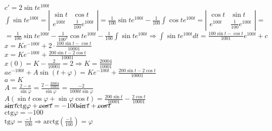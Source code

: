 $c'=2\sin t e^{100t}$\\
$\int \sin t e^{100t}=\left|\begin{array}{cc}\sin t & \cos t \\ e^{100t} & \frac{1}{100}e^{100t}\end{array}\right|=\frac{1}{100}\sin t e^{100t}-\frac{1}{100} \int \cos t e^{100t}=\left|\begin{array}{cc}\cos t & \sin t \\ e^{100t} & \frac{1}{100}e^{100t}\end{array}\right|=$\\
$=\frac{1}{100}\sin t e^{100t}-\frac{1}{100^2}\cos t e^{100t}-\frac{1}{100} \int \sin t e^{100t} \Rightarrow \int \sin t e^{100t} dt = \boxed{\frac{100\sin t - \cos t}{1001}e^{100t}+c}$\\
$\boxed{x=Ke^{-100t}+2\cdot\frac{100\sin t - \cos t}{10001}}$\\
$x=Ke^{-100t}+\frac{200\sin t -2\cos t}{10001}$\\
$x(0)=K-\frac{2}{10001}=2 \Rightarrow K=\frac{20004}{10001}$\\
$ae^{-100t}+A\sin(t+\varphi)=Ke^{-100t}+\frac{200\sin t - 2 \cos t}{10001}$\\
$a=K$\\
$A=\frac{2-a}{\sin \varphi}=\frac{2-\frac{20004}{10001}}{\sin \varphi}=\frac{-2}{1000t\sin\varphi}$\\
$A(\sin t \cos \varphi + \sin \varphi \cos t)=\frac{200\sin t}{10001}-\frac{2\cos t}{10001}$\\
$\cancel{\sin t}\text{ctg}\varphi+\cancel{\cos t}=-100\cancel{\sin t}+\cancel{\cos t}$\\
$\text{ctg}\varphi= -100$\\
$\text{tg}\varphi=\frac{-1}{100} \Rightarrow \boxed{\text{arctg}(\frac{-1}{100})=\varphi}$\\


\pagebreak
